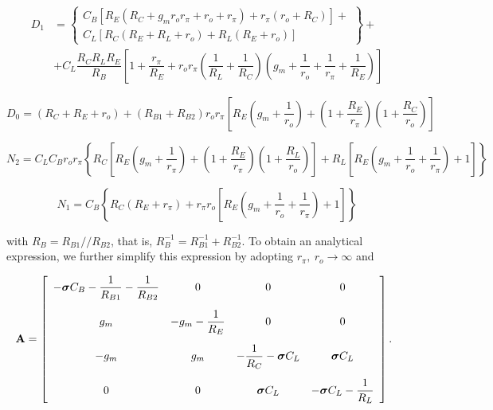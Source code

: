 \begin{align}
	D_1 &= \left\{
		\begin{array}{l}
			C_B \left[R_E\left(R_{C} + g_m r_o r_{\pi} + r_o + r_{\pi}\right) + r_{\pi}\left(r_o + R_{C}\right) \right] + \\%
			C_L \left[ R_{C}\left( R_E + R_L + r_o\right) + R_L\left(R_E + r_o\right)\right]
		\end{array}\right\} + \nonumber\\[5mm]
%
	&+ C_L \dfrac{R_CR_LR_E}{R_B}\left[ 1 + \dfrac{r_{\pi}}{R_E} + r_o r_{\pi}\left(\dfrac{1}{R_L} + \dfrac{1}{R_C}\right) \left( g_m + \dfrac{1}{r_o} + \dfrac{1}{r_{\pi}} + \dfrac{1}{R_E}\right)\right]
\end{align}

\begin{equation} D_0 = \left(R_{C} + R_E + r_o\right) + \left(R_{B1} + R_{B2}\right) r_o r_{\pi}\left[R_E\left(g_m  + \dfrac{1}{r_o}\right) + \left(1 + \dfrac{R_E}{r_{\pi}}\right)\left(1 + \dfrac{R_C}{r_o}\right)\right] \end{equation}

\small
\begin{equation} N_2 = C_LC_B r_or_\pi \left\{ R_{C} \left[ R_E \left( g_m + \dfrac{1}{r_\pi} \right) + \left(1 + \dfrac{R_E}{r_\pi}\right)\left(1 + \dfrac{R_L}{r_o}\right)\right] + R_L \left[R_E \left( g_m + \dfrac{1}{r_o} + \dfrac{1}{r_{\pi}}\right) + 1\right] \right\}\end{equation}
\normalsize

\begin{equation} N_1 = C_B \left\{R_{C}\left( R_E + r_{\pi}\right) + r_\pi r_o \left[ R_E \left(g_m + \dfrac{1}{r_o} + \dfrac{1}{r_{\pi}} \right) + 1\right] \right\} \end{equation}

	\noindent with $R_B = R_{B1}//R_{B2}$, that is, $R_B^{-1} = R_{B1}^{-1} + R_{B2}^{-1}$. To obtain an analytical expression, we further simplify this expression by adopting $r_\pi,\ r_o\to\infty$ and

\begin{equation}
\hspace{-2mm}\mathbf{A} = \left[\begin{array}{cccc}
	 - \dpo C_B - \dfrac{1}{R_{B1}} - \dfrac{1}{R_{B2}} & 0 & 0 & 0  \\[5mm]
	g_m & - g_m - \dfrac{1}{R_E} & 0 & 0 \\[5mm]
	-g_m & g_m & - \dfrac{1}{R_C} - \dpo C_L & \dpo C_L \\[5mm]
	0 & 0 & \dpo C_L & -\dpo C_L - \dfrac{1}{R_L}
\end{array}\right].
\end{equation}

